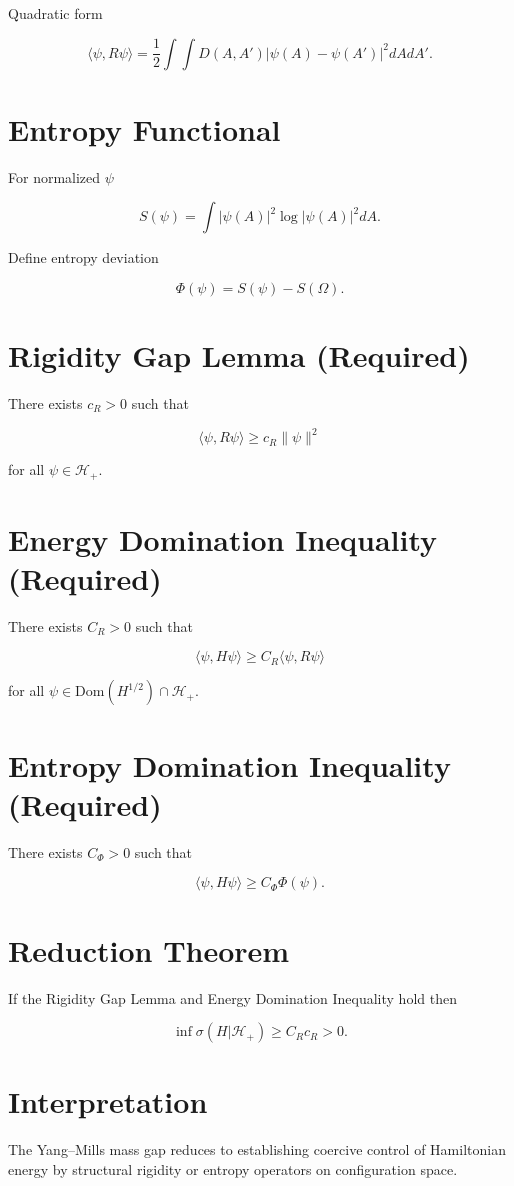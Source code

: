 \documentclass[11pt]{article}
\begin{document}
Quadratic form

\[
\langle \psi,R\psi\rangle =
\frac12 \int\int D(A,A')|\psi(A)-\psi(A')|^2 dA dA'.
\]

\section{Entropy Functional}

For normalized $\psi$

\[
S(\psi)=\int |\psi(A)|^2\log|\psi(A)|^2 dA.
\]

Define entropy deviation

\[
\Phi(\psi)=S(\psi)-S(\Omega).
\]

\section{Rigidity Gap Lemma (Required)}

There exists $c_R>0$ such that

\[
\langle\psi,R\psi\rangle \ge c_R \|\psi\|^2
\]

for all $\psi\in\mathcal{H}_+$.

\section{Energy Domination Inequality (Required)}

There exists $C_R>0$ such that

\[
\langle\psi,H\psi\rangle \ge C_R\langle\psi,R\psi\rangle
\]

for all $\psi\in\mathrm{Dom}(H^{1/2})\cap\mathcal{H}_+$.

\section{Entropy Domination Inequality (Required)}

There exists $C_\Phi>0$ such that

\[
\langle\psi,H\psi\rangle \ge C_\Phi\Phi(\psi).
\]

\section{Reduction Theorem}

If the Rigidity Gap Lemma and Energy Domination Inequality hold then

\[
\inf\sigma(H|\mathcal{H}_+) \ge C_R c_R > 0.
\]

\section{Interpretation}

The Yang--Mills mass gap reduces to establishing coercive control of Hamiltonian energy by structural rigidity or entropy operators on configuration space.
\end{document}
